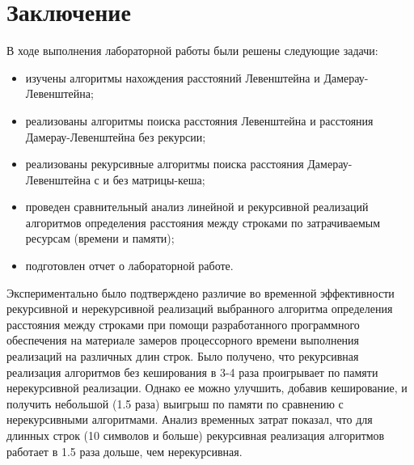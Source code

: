 \chapter*{Заключение}

В ходе выполнения лабораторной работы были решены следующие задачи:

\begin{itemize}
    \item изучены алгоритмы нахождения расстояний Левенштейна и Дамерау-Левенштейна;
	\item реализованы алгоритмы поиска расстояния Левенштейна и расстояния Дамерау-Левенштейна без рекурсии;
	\item реализованы рекурсивные алгоритмы поиска расстояния Дамерау-Левенштейна с и без матрицы-кеша;
	\item проведен сравнительный анализ линейной и рекурсивной реализаций алгоритмов определения расстояния между строками по затрачиваемым ресурсам (времени и памяти);
	\item подготовлен отчет о лабораторной работе.
\end{itemize}

Экспериментально было подтверждено различие во временной эффективности рекурсивной и нерекурсивной реализаций выбранного алгоритма определения расстояния между строками при помощи разработанного программного обеспечения на материале замеров процессорного времени выполнения реализаций на различных длин строк.
Было получено, что рекурсивная реализация алгоритмов без кеширования в 3-4 раза проигрывает по памяти нерекурсивной реализации. Однако ее можно улучшить, добавив кеширование, и получить небольшой (1.5 раза) выигрыш по памяти по сравнению с нерекурсивными алгоритмами. Анализ временных затрат показал, что для длинных строк (10 символов и больше) рекурсивная реализация алгоритмов работает в 1.5 раза дольше, чем нерекурсивная.
